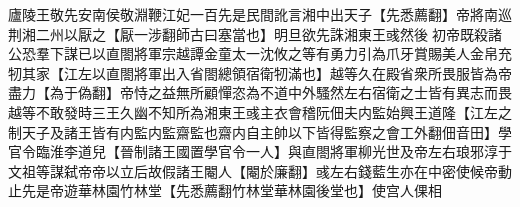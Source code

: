 廬陵王敬先安南侯敬淵鞭江妃一百先是民間訛言湘中出天子【先悉薦翻】帝將南巡荆湘二州以厭之【厭一涉翻師古曰塞當也】明旦欲先誅湘東王彧然後初帝既殺諸公恐羣下謀已以直閤將軍宗越譚金童太一沈攸之等有勇力引為爪牙賞賜美人金帛充牣其家【江左以直閤將軍出入省閤總領宿衛牣滿也】越等久在殿省衆所畏服皆為帝盡力【為于偽翻】帝恃之益無所顧憚恣為不道中外騷然左右宿衛之士皆有異志而畏越等不敢發時三王久幽不知所為湘東王彧主衣會稽阮佃夫内監始興王道隆【江左之制天子及諸王皆有内監内監齋監也齋内自主帥以下皆得監察之會工外翻佃音田】學官令臨淮李道兒【晉制諸王國置學官令一人】與直閤將軍柳光世及帝左右琅邪淳于文祖等謀弑帝帝以立后故假諸王閹人【閹於廉翻】彧左右錢藍生亦在中密使候帝動止先是帝遊華林園竹林堂【先悉薦翻竹林堂華林園後堂也】使宫人倮相